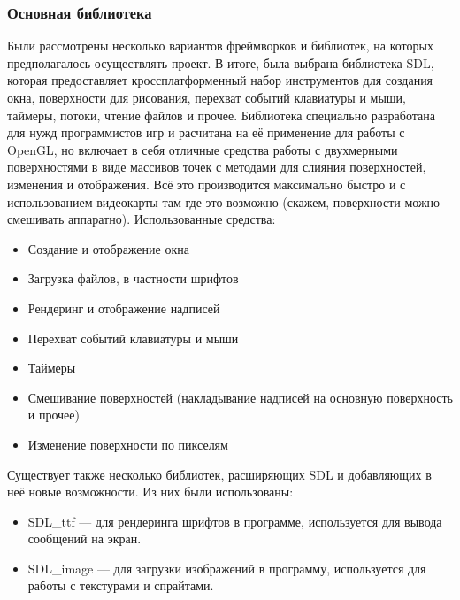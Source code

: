 \documentclass[a4paper,12pt]{report}
\begin{document}
\subsubsection{Основная библиотека}
Были рассмотрены несколько вариантов фреймворков и библиотек, на которых предполагалось осуществлять проект. В итоге, была выбрана библиотека SDL, которая предоставляет кроссплатформенный набор инструментов для создания окна, поверхности для рисования, перехват событий клавиатуры и мыши, таймеры, потоки, чтение файлов и прочее. Библиотека специально разработана для нужд программистов игр и расчитана на её применение для работы с OpenGL, но включает в себя отличные средства работы с двухмерными поверхностями в виде массивов точек с методами для слияния поверхностей, изменения и отображения. Всё это производится максимально быстро и с использованием видеокарты там где это возможно (скажем, поверхности можно смешивать аппаратно). Использованные средства:
\begin{itemize}
\item Создание и отображение окна
\item Загрузка файлов, в частности шрифтов
\item Рендеринг и отображение надписей
\item Перехват событий клавиатуры и мыши
\item Таймеры
\item Смешивание поверхностей (накладывание надписей на основную поверхность и прочее)
\item Изменение поверхности по пикселям
\end{itemize}
Существует также несколько библиотек, расширяющих SDL и добавляющих в неё новые возможности. Из них были использованы:
\begin{itemize}
\item SDL\_ttf --- для рендеринга шрифтов в программе, используется для вывода сообщений на экран.
\item SDL\_image --- для загрузки изображений в программу, используется для работы с текстурами и спрайтами.
\end{itemize}
\end{document}
